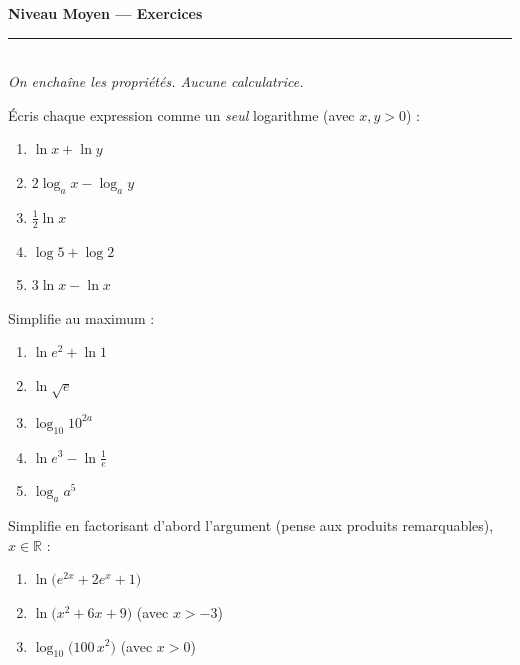 \documentclass[11pt,a4paper]{article}
\newcommand{\R}{\mathbb{R}}
\newcommand{\ds}{\displaystyle}
\begin{document}
\begin{center}
{\LARGE\bfseries\color{primarydark} Niveau Moyen — Exercices}\\[2pt]
{\color{primary}\rule{0.45\textwidth}{1.2pt}}\\[3pt]
{\small\itshape On enchaîne les propriétés. Aucune calculatrice.}
\end{center}
\vspace{1mm}

\begin{exo}
Écris chaque expression comme un \emph{seul} logarithme (avec $x,y>0$) :
\begin{enumerate}[label=\alph*),leftmargin=2em,topsep=1pt,itemsep=1pt]
  \item $\ln x+\ln y$ \qquad
  \item $2\log_a x-\log_a y$ \qquad
  \item $\ds\frac12\ln x$ \qquad
  \item $\log 5+\log 2$ \qquad
  \item $3\ln x-\ln x$
\end{enumerate}
\end{exo}

\begin{exo}
Simplifie au maximum :
\begin{enumerate}[label=\alph*),leftmargin=2em,topsep=1pt,itemsep=1pt]
  \item $\ln e^{2}+\ln 1$ \qquad
  \item $\ds\ln\sqrt{e}$ \qquad
  \item $\log_{10}10^{2a}$ \qquad
  \item $\ds\ln e^{3}-\ln\frac1e$ \qquad
  \item $\log_a a^{5}$
\end{enumerate}
\end{exo}

\begin{exo}
Simplifie en factorisant d'abord l'argument (pense aux produits remarquables), $x\in\R$ :
\begin{enumerate}[label=\alph*),leftmargin=2em,topsep=1pt,itemsep=1pt]
  \item $\ln\bigl(e^{2x}+2e^{x}+1\bigr)$ \qquad
  \item $\ln\bigl(x^{2}+6x+9\bigr)$ (avec $x>-3$)
  \item $\ds\log_{10}\bigl(100\,x^{2}\bigr)$ (avec $x>0$)
\end{enumerate}
\end{exo}
\end{document}
